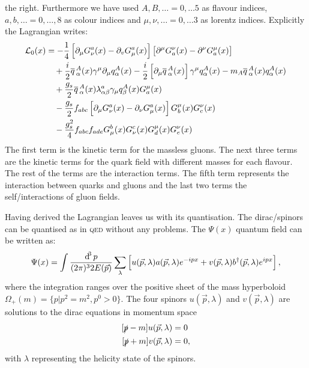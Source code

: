 \documentclass[../../index.tex]{subfiles}
\begin{document}
the right. Furthermore we have used $A, B, \dotsc = 0, \dotsc 5$ as flavour
indices, $a, b, \dotsc = 0, \dotsc, 8 $ as colour indices and $\mu, \nu, \dotsc
= 0, \dotsc 3$ as lorentz indices. Explicitly the Lagrangian writes:
\begin{equation}
  \begin{split}
    \mathcal{L}_0(x) &=- \frac{1}{4} \left[ \partial_\mu G_\nu^a(x) - \partial_v G_\mu^a(x) \right] \left[ \partial^\mu G_a^\nu(x) - \partial^\nu G^\mu_a(x) \right] \\
    &\quad+ \frac{i}{2}\overline{q}\,_\alpha^A(x) \gamma^\mu \partial_\mu q_\alpha^A(x) - \frac{i}{2} \left[ \partial_\mu \overline{q}\,_\alpha^A(x) \right] \gamma^\mu q_\alpha^A(x) - m_A \overline{q}\,_\alpha^A(x) q_\alpha^A(x) \\
    &\quad+ \frac{g_s}{2} \overline{q}\,_\alpha^A(x) \lambda^a_{\alpha \beta}\gamma_\mu q_\beta^A(x) G^\mu_a(x) \\
    &\quad- \frac{g_s}{2}f_{abc}\left[ \partial_\mu G_\nu^a(x) - \partial_\nu G_\mu^a(x)\right] G_b^\mu(x) G_c^\nu(x) \\
    &\quad- \frac{g_s^2}{4} f_{abc}f_{ade} G_\mu^b(x) G_\nu^c(x) G_d^\mu(x)
    G_e^\nu(x)
  \end{split}
\end{equation}
The first term is the kinetic term for the massless gluons. The next three terms
are the kinetic terms for the quark field with different masses for each
flavour. The rest of the terms are the interaction terms. The fifth term
represents the interaction between quarks and gluons and the last two terms the
self\-/interactions of gluon fields.

Having derived the Lagrangian leaves us with its quantisation. The
dirac\-/spinors can be quantised as in \textsc{qed} without any problems. The
$\Psi(x)$ quantum field can be written as:
\begin{equation}
  \Psi(x) = \int \frac{\dif^3 p}{(2\pi)^3 2E(\vec p)} \sum_\lambda \left[ u(\vec p, \lambda) a(\vec p, \lambda) e^{-ipx} + v(\vec p, \lambda) b^\dagger (\vec p, \lambda) e^{ipx} \right],
\end{equation}
where the integration ranges over the positive sheet of the mass hyperboloid
$\Omega_+(m) = \{p \vert p^2 = m^2, p^0 > 0 \}$. The four spinors $u(\vec p,
\lambda)$ and $v(\vec p, \lambda)$ are solutions to the dirac equations in
momentum space
\begin{equation}
  \begin{split}
    [\slashed p - m]u(\vec p, \lambda) &= 0 \\
    [\slashed p + m]v(\vec p, \lambda) &= 0,
  \end{split}
\end{equation}
with $\lambda$ representing the helicity state of the spinors.
\end{document}
